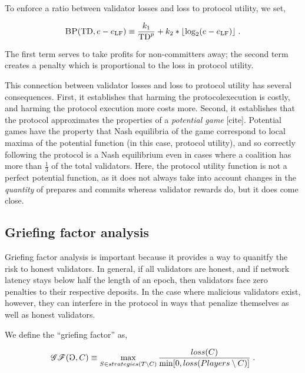 \documentclass[12pt, final]{article}
\newcommand{\epoch}{\ensuremath{e}\xspace}
\newcommand{\BP}{\textsc{BP}\xspace}
\newcommand{\totaldeposit}{\textnormal{TD}\xspace}
\newcommand{\gamesymbol}{ \reflectbox{G} }
\newcommand{\epochLF}{\ensuremath{\epoch_{\textnormal{LF}}}\xspace}
\begin{document}
To enforce a ratio between validator losses and loss to protocol utility, we set,

\begin{equation}
\BP(\totaldeposit, \epoch - \epochLF) \equiv \frac{k_1}{\totaldeposit^p} + k_2 * \lfloor \log_2(\epoch - \epochLF) \rfloor\; .
\end{equation}

The first term serves to take profits for non-committers away; the second term creates a penalty which is proportional to the loss in protocol utility.

This connection between validator losses and loss to protocol utility has several consequences. First, it establishes that harming the protocolexecution is costly, and harming the protocol execution more costs more. Second, it establishes that the protocol approximates the properties of a \emph\emph{potential game} [cite]. Potential games have the property that Nash equilibria of the game correspond to local maxima of the potential function (in this case, protocol utility), and so correctly following the protocol is a Nash equilibrium even in cases where a coalition has more than $\frac{1}{3}$ of the total validators. Here, the protocol utility function is not a perfect potential function, as it does not always take into account changes in the \emph{quantity} of prepares and commits whereas validator rewards do, but it does come close.

\subsection{Griefing factor analysis}
\label{sect:griefingfactor}
Griefing factor analysis is important because it provides a way to quanitfy the risk to honest validators. In general, if all validators are honest, and if network latency stays below half  the length of an epoch, then validators face zero penalties to their respective deposits.  In the case where malicious validators exist, however, they can interfere in the protocol in ways that penalize themselves as well as honest validators.

We define the ``griefing factor'' as,

\begin{equation}
\mathscr{GF}(\gamesymbol,C) \equiv \max_{S \in strategies(T \setminus C)} \frac{loss(C) }{\min[ 0, loss(Players \setminus C) ] } \; .
\end{equation}
\end{document}
